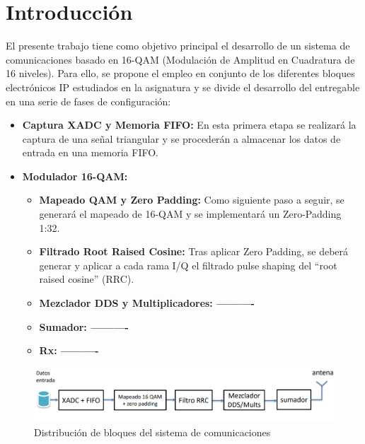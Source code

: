 \chapter{Introducción}
\label{section:intro}

El presente trabajo tiene como objetivo principal el desarrollo de un sistema de comunicaciones basado en 16-QAM (Modulación de Amplitud en Cuadratura de 16 niveles). Para ello, se propone el empleo en conjunto de los diferentes bloques electrónicos IP estudiados en la asignatura y se divide el desarrollo del entregable en una serie de fases de configuración:

\vspace{1mm}

\begin{itemize}
    \item \textbf{Captura XADC y Memoria FIFO:} En esta primera etapa se realizará la captura de una señal triangular y se procederán a almacenar los datos de entrada en una memoria FIFO.
    \item \textbf{Modulador 16-QAM:}
        \begin{itemize}
            \item \textbf{Mapeado QAM y Zero Padding: } Como siguiente paso a seguir, se generará el mapeado de 16-QAM y se implementará un Zero-Padding 1:32. 
            \item \textbf{Filtrado Root Raised Cosine: } Tras aplicar Zero Padding, se deberá generar y aplicar a cada rama I/Q el filtrado pulse shaping del “root raised cosine” (RRC).
            \item \textbf{Mezclador DDS y Multiplicadores: ----------}
            \item \textbf{Sumador: ----------}
            \item \textbf{Rx: ----------}
        \end{itemize}
    
\end{itemize}

\vspace{3mm}

    \begin{figure}[h]
    	\centering
    	\includegraphics[width=1\textwidth]{img/diseno/sistema.PNG}
    	\caption{Distribución de bloques del sistema de comunicaciones}
    	\label{fig:sistema}
    \end{figure}
    
